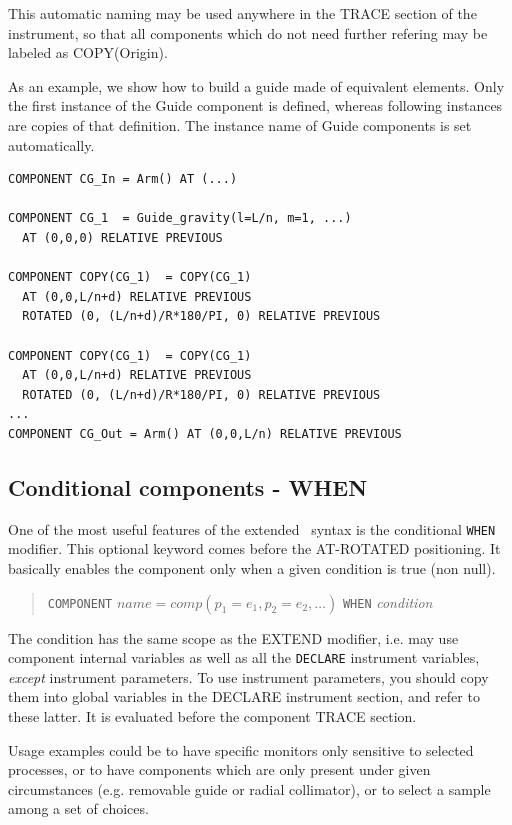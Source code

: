 This automatic naming may be used anywhere in the TRACE section of the instrument, so that all components which do not need further refering may be labeled as COPY(Origin).

As an example, we show how to build a guide made of equivalent elements. Only the first instance of the Guide component is defined, whereas following instances are copies of that definition. The instance name of Guide components is set automatically.

\begin{verbatim}
COMPONENT CG_In = Arm() AT (...)

COMPONENT CG_1  = Guide_gravity(l=L/n, m=1, ...)
  AT (0,0,0) RELATIVE PREVIOUS

COMPONENT COPY(CG_1)  = COPY(CG_1)
  AT (0,0,L/n+d) RELATIVE PREVIOUS
  ROTATED (0, (L/n+d)/R*180/PI, 0) RELATIVE PREVIOUS

COMPONENT COPY(CG_1)  = COPY(CG_1)
  AT (0,0,L/n+d) RELATIVE PREVIOUS
  ROTATED (0, (L/n+d)/R*180/PI, 0) RELATIVE PREVIOUS
...
COMPONENT CG_Out = Arm() AT (0,0,L/n) RELATIVE PREVIOUS
\end{verbatim}

\subsection{Conditional components - WHEN}
\label{s:instrdefs-extend-when}

One of the most useful features of the extended \MCS\ syntax is the conditional \texttt{WHEN} modifier. This optional keyword comes before the AT-ROTATED positioning. It basically enables the component only when a given condition is true (non null).

\begin{quote}
  \texttt{COMPONENT} $\textit{name} = \textit{comp}(p_1 = e_1, p_2 = e_2, \ldots)$
  \texttt{WHEN} {\it condition}
\end{quote}
The condition has the same scope as the EXTEND modifier, i.e. may use component internal variables as well as all the \texttt{DECLARE} instrument variables, \emph{except} instrument parameters. To use instrument parameters, you should copy them into global variables in the DECLARE instrument section, and refer to these latter.
It is evaluated before the component TRACE section.

Usage examples could be to have specific monitors only sensitive to selected processes, or to have components which are only present under given circumstances (e.g. removable guide or radial collimator), or to select a sample among a set of choices.

